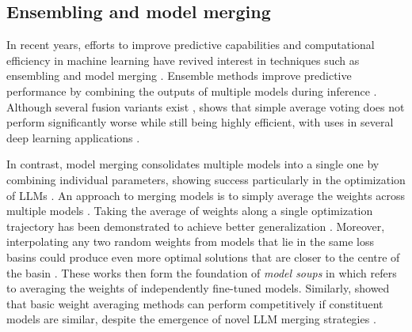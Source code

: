 \subsection{Ensembling and model merging}


In recent years, efforts to improve predictive capabilities and computational efficiency in machine learning have revived interest in techniques such as ensembling \citep{ganaie2022ensemble, mohammed2023comprehensive} and model merging \citep{yang2024model, charles2024acree}. Ensemble methods improve predictive performance by combining the outputs of multiple models during inference \citep{hansen1990neural, dietterich2000ensemble}. Although several fusion variants exist \citep{kim2003constructing, soares2004meta}, \citet{cheng2018the} shows that simple average voting \citep{breiman1996bagging} does not perform significantly worse while still being highly efficient, with uses in several deep learning applications \citep{cheng2018the, romero2020automatic}. 

In contrast, model merging consolidates multiple models into a single one by combining individual parameters, showing success particularly in the optimization of LLMs \citep{ilharco2022patching, jin2023dataless, davari2024model}. An approach to merging models is to simply average the weights across multiple models \citep{utans1996weight}. Taking the average of weights along a single optimization trajectory has been demonstrated to achieve better generalization \citep{izmailov2018@averaging, frankle2020linear}. Moreover, interpolating any two random weights from models that lie in the same loss basins could produce even more optimal solutions that are closer to the centre of the basin \citep{neyshabur2020being}. These works then form the foundation of \textit{model soups} in \citet{wortsman2022model} which refers to averaging the weights of independently fine-tuned models. Similarly, \citet{gauthier2024merging} showed that basic weight averaging methods can perform competitively if constituent models are similar, despite the emergence of novel LLM merging strategies \citep{rame2023model, chronopoulou2023adaptersoup, yu2024language}.

